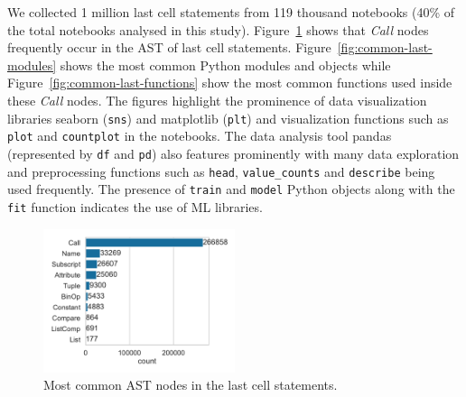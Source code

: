 We collected 1 million last cell statements from 119 thousand notebooks (40\% of the total notebooks analysed in this study). Figure~\ref{fig:common-last-nodes} shows that \emph{Call} nodes frequently occur in the AST of last cell statements. Figure~\ref{fig:common-last-modules} shows the most common Python modules and objects while Figure~\ref{fig:common-last-functions} show the most common functions used inside these \emph{Call} nodes. The figures highlight the prominence of data visualization libraries seaborn (\lstinline{sns}) and matplotlib (\lstinline{plt}) and visualization functions such as \lstinline{plot} and \lstinline{countplot} in the notebooks. The data analysis tool pandas (represented by \lstinline{df} and \lstinline{pd}) also features prominently with many data exploration and preprocessing functions such as \lstinline{head}, \lstinline{value_counts} and \lstinline{describe} being used frequently. The presence of \lstinline{train} and \lstinline{model} Python objects along with the \lstinline{fit} function indicates the use of ML libraries.


\begin{figure}
  \centering
  \includegraphics[width=0.5\textwidth]{common-last-nodes.pdf}
  \caption{Most common AST nodes in the last cell statements.}
  \label{fig:common-last-nodes}
\end{figure}

